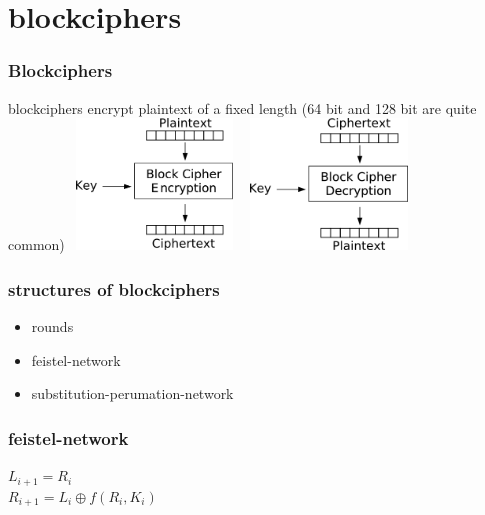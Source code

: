 \section{blockciphers}
\begin{frame}
	\frametitle{Blockciphers}
	blockciphers encrypt plaintext of a fixed length (64 bit and 128 bit are quite common)
	\vspace{1cm}
		\includegraphics[width=4.5cm,height=3.5cm]{Encryption}
		\includegraphics[width=4.5cm,height=3.5cm]{Decryption}
\end{frame}

\begin{frame}
\frametitle{structures of blockciphers}
	\begin{itemize}
		\item rounds
		\item feistel-network
		\item substitution-perumation-network
	\end{itemize}
\end{frame}


\begin{frame}
\frametitle{feistel-network}
	$L_{i+1} = R_i $ \\
	$R_{i+1} = L_i \oplus f(R_i, K_i)$
\end{frame}

